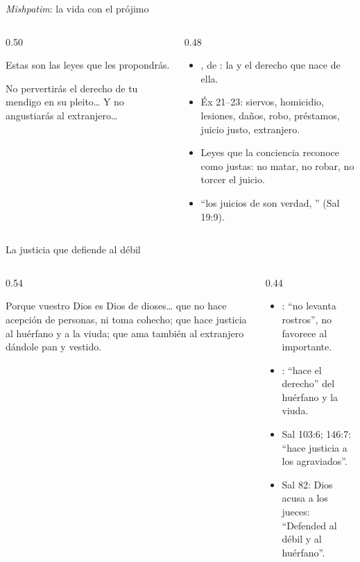 \begin{frame}{\emph{Mishpatim}: la vida con el prójimo}
\begin{columns}[c,onlytextwidth]
\begin{column}{0.50\textwidth}
\begin{cita}Estas son las leyes que les propondrás.\end{cita}
\begin{center}\end{center}
\begin{cita}No pervertirás el derecho de tu mendigo en su pleito\ldots{} Y no angustiarás al extranjero\ldots{}\end{cita}
\end{column}
\begin{column}{0.48\textwidth}\small
\begin{itemize}
\item {}, de : la  y el derecho que nace de ella.
\item Éx 21--23: siervos, homicidio, lesiones, daños, robo, préstamos, juicio justo, extranjero.
\item Leyes que la conciencia reconoce como justas: no matar, no robar, no torcer el juicio.
\item ``los juicios de \SENOR{} son verdad, '' (Sal 19:9).
\end{itemize}
\end{column}
\end{columns}
\end{frame}

\begin{frame}{La justicia que defiende al débil}
\begin{columns}[c,onlytextwidth]
\begin{column}{0.54\textwidth}
\begin{cita}Porque \SENOR{} vuestro Dios es Dios de dioses\ldots{} que no hace acepción de personas, ni toma cohecho; que hace justicia al huérfano y a la viuda; que ama también al extranjero dándole pan y vestido.\end{cita}
\end{column}
\begin{column}{0.44\textwidth}\scriptsize
\begin{itemize}
\item {}: ``no levanta rostros'', no favorece al importante.
\item {}: ``hace el derecho'' del huérfano y la viuda.
\item Sal 103:6; 146:7: ``hace justicia a los agraviados''.
\item Sal 82: Dios acusa a los jueces: ``Defended al débil y al huérfano''.
\end{itemize}
\end{column}
\end{columns}
\end{frame}

